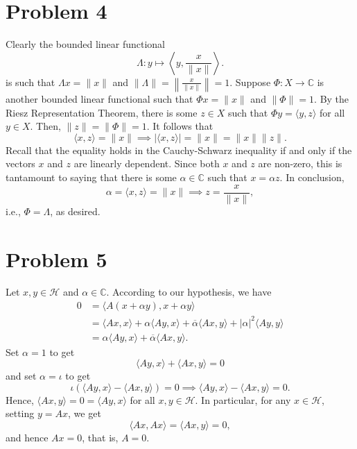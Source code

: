 \documentclass[10pt]{amsart}
\theoremstyle{thmstyle}
\theoremstyle{defstyle}
\newcommand{\bbC}{\mathbb{C}}
\newcommand{\calH}{\mathcal{H}} %
\begin{document}
\section{Problem 4}

Clearly the bounded linear functional 
\begin{equation*}
    \Lambda\colon y\longmapsto\left\langle y,\frac{x}{\|x\|}\right\rangle.
\end{equation*}
is such that $\Lambda x = \|x\|$ and $\|\Lambda\| = \left\|\frac{x}{\|x\|}\right\| = 1$. Suppose $\Phi: X\to\bbC$ is another bounded linear functional such that $\Phi x = \|x\|$ and $\|\Phi\| = 1$. By the Riesz Representation Theorem, there is some $z\in X$ such that $\Phi y = \langle y,z \rangle$ for all $y\in X$. Then, $\|z\| = \|\Phi\| = 1$. It follows that 
\begin{equation*}
    \langle x, z\rangle = \|x\|\implies|\langle x, z\rangle| = \|x\| = \|x\|\|z\|.
\end{equation*}
Recall that the equality holds in the Cauchy-Schwarz inequality if and only if the vectors $x$ and $z$ are linearly dependent. Since both $x$ and $z$ are non-zero, this is tantamount to saying that there is some $\alpha\in\bbC$ such that $x = \alpha z$. In conclusion, 
\begin{equation*}
    \alpha = \langle x, z\rangle = \|x\|\implies z = \frac{x}{\|x\|},
\end{equation*}
i.e., $\Phi = \Lambda$, as desired.


\section{Problem 5}

Let $x,y\in\calH$ and $\alpha\in\bbC$. According to our hypothesis, we have 
\begin{align*}
    0 &= \langle A(x + \alpha y), x + \alpha y\rangle\\
    &= \langle Ax, x\rangle + \alpha\langle Ay, x\rangle + \overline\alpha\langle Ax, y\rangle + |\alpha|^2\langle Ay, y\rangle\\
    &= \alpha\langle Ay, x\rangle + \overline\alpha\langle Ax, y\rangle.
\end{align*}
Set $\alpha = 1$ to get 
\begin{equation*}
    \langle Ay, x\rangle + \langle Ax, y\rangle = 0
\end{equation*}
and set $\alpha = \iota$ to get 
\begin{equation*}
    \iota\left(\langle Ay, x\rangle - \langle Ax, y\rangle\right) = 0\implies\langle Ay, x\rangle - \langle Ax, y\rangle = 0.
\end{equation*}
Hence, $\langle Ax, y\rangle = 0 = \langle Ay, x\rangle$ for all $x, y\in\calH$. In particular, for any $x\in\calH$, setting $y = Ax$, we get 
\begin{equation*}
    \langle Ax, Ax\rangle = \langle Ax, y\rangle = 0,
\end{equation*}
and hence $Ax = 0$, that is, $A = 0$.
\end{document}
